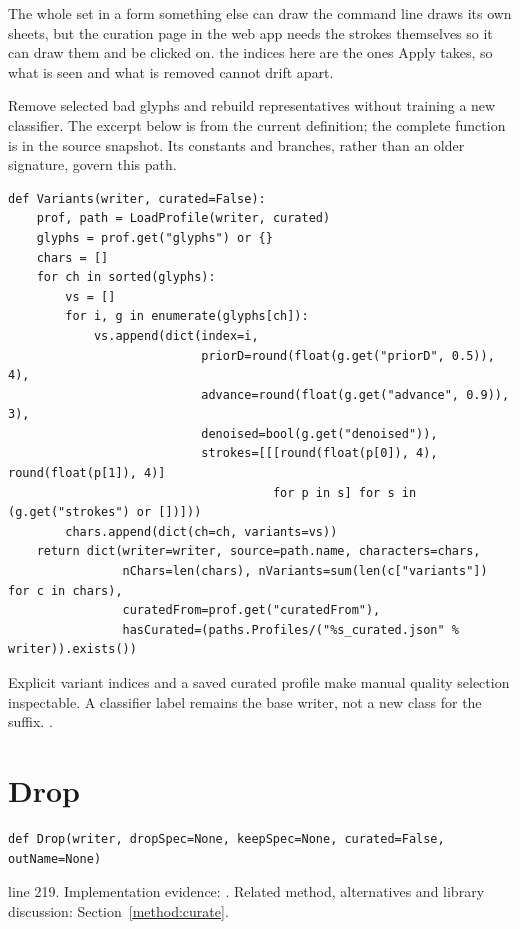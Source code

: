 The whole set in a form something else can draw the command line draws its own sheets, but the curation page in the web app needs the strokes themselves so it can draw them and be clicked on. the indices here are the ones Apply takes, so what is seen and what is removed cannot drift apart.


Remove selected bad glyphs and rebuild representatives without training a new classifier. The excerpt below is from the current definition; the complete function is in the source snapshot. Its constants and branches, rather than an older signature, govern this path.


\begin{lstlisting}[style=plain]
def Variants(writer, curated=False):
    prof, path = LoadProfile(writer, curated)
    glyphs = prof.get("glyphs") or {}
    chars = []
    for ch in sorted(glyphs):
        vs = []
        for i, g in enumerate(glyphs[ch]):
            vs.append(dict(index=i,
                           priorD=round(float(g.get("priorD", 0.5)), 4),
                           advance=round(float(g.get("advance", 0.9)), 3),
                           denoised=bool(g.get("denoised")),
                           strokes=[[[round(float(p[0]), 4), round(float(p[1]), 4)]
                                     for p in s] for s in (g.get("strokes") or [])]))
        chars.append(dict(ch=ch, variants=vs))
    return dict(writer=writer, source=path.name, characters=chars,
                nChars=len(chars), nVariants=sum(len(c["variants"]) for c in chars),
                curatedFrom=prof.get("curatedFrom"),
                hasCurated=(paths.Profiles/("%s_curated.json" % writer)).exists())
\end{lstlisting}
Explicit variant indices and a saved curated profile make manual quality selection inspectable. A classifier label remains the base writer, not a new class for the suffix. \cite{code2026,haines2016,pillowdraw}.


\section{Drop}\label{fn:curate:Drop}
\begin{lstlisting}[style=sig]
def Drop(writer, dropSpec=None, keepSpec=None, curated=False, outName=None)
\end{lstlisting}
 line 219. Implementation evidence: \cite{code2026}. Related method, alternatives and library discussion: Section~\ref{method:curate}.



